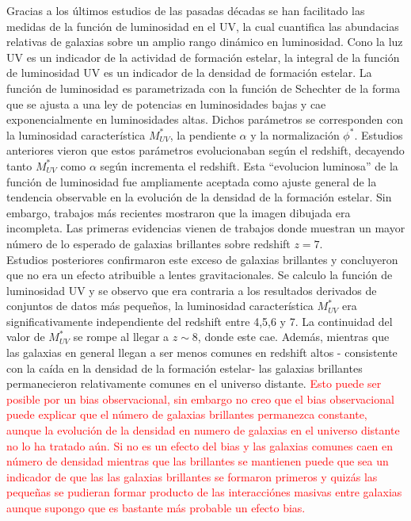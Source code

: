 \documentclass{article}
\begin{document}
Gracias a los últimos estudios de las pasadas décadas se han facilitado las medidas de la función de luminosidad en el UV, la cual cuantifica las abundacias relativas de galaxias sobre un amplio rango dinámico en luminosidad. Cono la luz UV es un indicador de la actividad de formación estelar, la integral de la función de luminosidad UV es un indicador de la densidad de formación estelar. La función de luminosidad es parametrizada con la función de Schechter de la forma que se ajusta a una ley de potencias en luminosidades bajas y cae exponencialmente en luminosidades altas. Dichos parámetros se corresponden con la luminosidad característica $M_{UV}^*$, la pendiente $\alpha$ y la normalización $\phi^*$. Estudios anteriores vieron que estos parámetros evolucionaban según el redshift, decayendo tanto $M_{UV}^*$ como $\alpha$ según incrementa el redshift. Esta ``evolucion luminosa'' de la función de luminosidad fue ampliamente aceptada como ajuste general de la tendencia observable en la evolución de la densidad de la formación estelar. Sin embargo, trabajos más recientes mostraron que la imagen dibujada era incompleta. Las primeras evidencias vienen de trabajos donde muestran un mayor número de lo esperado de galaxias brillantes sobre redshift $z=7$. \\

Estudios posteriores confirmaron este exceso de galaxias brillantes y concluyeron que no era un efecto atribuible a lentes gravitacionales. Se calculo la función de luminosidad UV y se observo que era contraria a los resultados derivados de conjuntos de datos más pequeños, la luminosidad característica $M_{UV}^*$ era significativamente independiente del redshift entre 4,5,6 y 7. La continuidad del valor de $M_{UV}^*$ se rompe al llegar a $z\sim 8$, donde este cae. Además, mientras que las galaxias en general llegan a ser menos comunes en redshift altos - consistente con la caída en la densidad de la formación estelar- las galaxias brillantes permanecieron relativamente comunes en el universo distante. \textcolor{red}{Esto puede ser posible por un bias observacional, sin embargo no creo que el bias observacional puede explicar que el número de galaxias brillantes permanezca constante, aunque la evolución de la densidad en numero de galaxias en el universo distante no lo ha tratado aún. Si no es un efecto del bias y las galaxias comunes caen en número de densidad mientras que las brillantes se mantienen puede que sea un indicador de que las las galaxias brillantes se formaron primeros y quizás las pequeñas se pudieran formar producto de las interacciónes masivas entre galaxias aunque supongo que es bastante más probable un efecto bias.}\\
\end{document}
